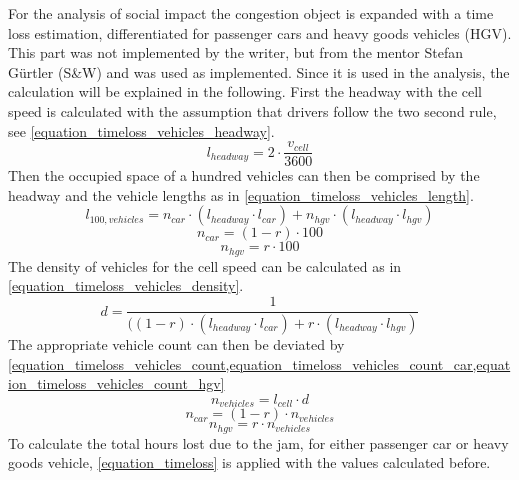 For the analysis of social impact the congestion object is expanded with a time loss estimation, differentiated for passenger cars and heavy goods vehicles (HGV). This part was not implemented by the writer, but from the mentor Stefan Gürtler (S\&W) and was used as implemented. Since it is used in the analysis, the calculation will be explained in the following. First the headway with the cell speed is calculated with the assumption that drivers follow the two second rule, see \cref{equation_timeloss_vehicles_headway}.
\begin{equation}
	l_{headway} = 2 \cdot \frac{v_{cell}}{3600}
	\label{equation_timeloss_vehicles_headway}
\end{equation}
Then the occupied space of a hundred vehicles can then be comprised by the headway and the vehicle lengths as in \cref{equation_timeloss_vehicles_length}.
\begin{equation}
	l_{100,vehicles} = n_{car} \cdot (l_{headway} \cdot l_{car}) + n_{hgv} \cdot (l_{headway} \cdot l_{hgv})
	\label{equation_timeloss_vehicles_length}
\end{equation}
\begin{equation}
	n_{car} = (1-r) \cdot 100
\end{equation}
\begin{equation}
	n_{hgv} = r \cdot 100 
\end{equation}
The density of vehicles for the cell speed can be calculated as in \cref{equation_timeloss_vehicles_density}.
\begin{equation}
	d = \frac{1}{((1-r) \cdot (l_{headway} \cdot l_{car}) + r \cdot (l_{headway} \cdot l_{hgv})}
	\label{equation_timeloss_vehicles_density}
\end{equation}
The appropriate vehicle count can then be deviated by \cref{equation_timeloss_vehicles_count,equation_timeloss_vehicles_count_car,equation_timeloss_vehicles_count_hgv}
\begin{equation}
	n_{vehicles} = l_{cell} \cdot d
	\label{equation_timeloss_vehicles_count}
\end{equation}
\begin{equation}
	n_{car} = (1-r) \cdot n_{vehicles}
	\label{equation_timeloss_vehicles_count_car}
\end{equation}
\begin{equation}
	n_{hgv} = r \cdot n_{vehicles}
	\label{equation_timeloss_vehicles_count_hgv}
\end{equation}
To calculate the total hours lost due to the jam, for either passenger car or heavy goods vehicle, \cref{equation_timeloss} is applied with the values calculated before.
